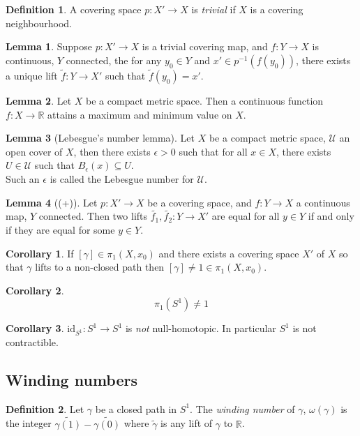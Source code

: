\documentclass[a4paper,14pt]{extarticle}
\theoremstyle{definition}
\newtheorem*{definition}{Definition}
\newtheorem*{lemma}{Lemma}
\newtheorem*{corollary}{Corollary}
\begin{document}
\begin{definition}
  A covering space $p:X'\rightarrow X$ is \emph{trivial} if $X$ is a covering neighbourhood.
\end{definition}

\begin{lemma}
  Suppose $p:X'\rightarrow X$ is a trivial covering map, and $f:Y\rightarrow X$ is continuous, 
  $Y$ connected, the for any $y_0\in Y$ and $x'\in p^{-1}(f(y_0))$, there exists a unique 
  lift $\tilde{f}:Y\rightarrow X'$ such that $\tilde{f}(y_0)=x'$.
\end{lemma}

\begin{lemma}
  Let $X$ be a compact metric space. Then a continuous function $f:X\rightarrow\mathbb{R}$  attains a maximum and minimum value on $X$.
\end{lemma}

\begin{lemma}[Lebesgue's number lemma]
  Let $X$ be a compact metric space, $\mathcal{U}$ an open cover of $X$, then there 
  exists $\epsilon>0$ such that for all $x\in X$, there exists $U\in\mathcal{U}$ such that 
  $B_\epsilon(x)\subseteq U$. \\
  Such an $\epsilon$ is called the Lebesgue number for $\mathcal{U}$.
\end{lemma}

\begin{lemma}[(+)]
  Let $p:X'\rightarrow X$ be a covering space, and $f:Y\rightarrow X$ a continuous map, $Y$ 
  connected. Then two lifts $\tilde{f_1},\tilde{f_2}:Y\rightarrow X'$ are equal for all 
  $y\in Y$ if and only if they are equal for some $y\in Y$.
\end{lemma}

\begin{corollary}
  If $[\gamma]\in\pi_1(X,x_0)$ and there exists a covering space $X'$ of $X$ so that 
  $\gamma$ lifts to a non-closed path then $[\gamma]\neq1\in\pi_1(X,x_0)$.
\end{corollary}

\begin{corollary}
  \[\pi_1(S^1)\neq1\]
\end{corollary}

\begin{corollary}
  $\text{id}_{S^1}:S^1\rightarrow S^1$ is \emph{not} null-homotopic. In particular $S^1$
  is not contractible.
\end{corollary}

\subsection{Winding numbers}
\begin{definition}
  Let $\gamma$ be a closed path in $S^1$. The \emph{winding number} of $\gamma$, 
  $\omega(\gamma)$ is the integer $\tilde{\gamma(1)}-\tilde{\gamma(0)}$ where $\tilde{\gamma}$
  is any lift of $\gamma$ to $\mathbb{R}$.
\end{definition}
\end{document}
